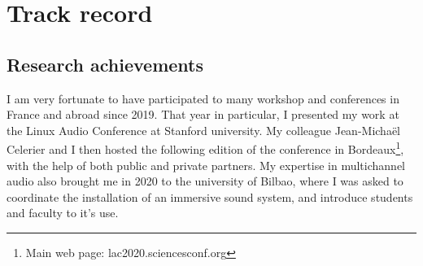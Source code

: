 \documentclass[journal,onecolumn]{IEEEtran}
\begin{document}
\section{Track record}

\subsection{Research achievements} %
I am very fortunate to have participated to many workshop and conferences in France and abroad since 2019. That year in particular, I presented my work at the Linux Audio Conference at Stanford university. My colleague Jean-Michaël Celerier and I then hosted the following edition of the conference in Bordeaux\footnote{Main web page: lac2020.sciencesconf.org}, with the help of both public and private partners. 
My expertise in multichannel audio also brought me in 2020 to the university of Bilbao, where I was asked to coordinate the installation of an immersive sound system, and introduce students and faculty to it's use.
\end{document}
